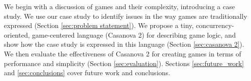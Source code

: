 We begin with a discussion of games and their complexity, introducing a case study. We use our case study to identify issues in the way games are traditionally expressed (Section \ref{sec:problem statement}). We propose a tiny, concurrency-oriented, game-centered language (Casanova 2) for describing game logic, and show how the case study is expressed in this language (Section \ref{sec:casanova 2}). We then evaluate the effectiveness of Casanova 2 for creating games in terms of performance and simplicity (Section \ref{sec:evaluation}). Sections \ref{sec:future_work} and \ref{sec:conclusions} cover future work and conclusions. 